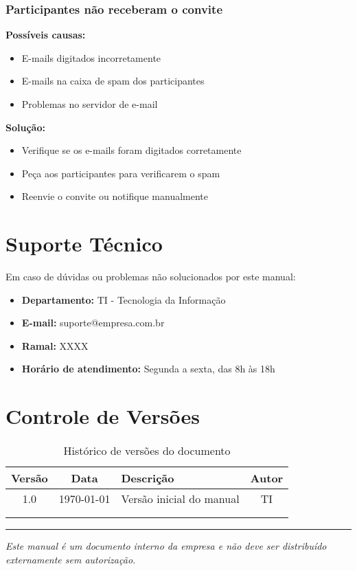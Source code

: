 \documentclass[12pt,a4paper]{article}
\begin{document}
\subsubsection{Participantes não receberam o convite}

\textbf{Possíveis causas:}
\begin{itemize}[leftmargin=*]
    \item E-mails digitados incorretamente
    \item E-mails na caixa de spam dos participantes
    \item Problemas no servidor de e-mail
\end{itemize}

\textbf{Solução:}
\begin{itemize}[leftmargin=*]
    \item Verifique se os e-mails foram digitados corretamente
    \item Peça aos participantes para verificarem o spam
    \item Reenvie o convite ou notifique manualmente
\end{itemize}

\newpage

\section{Suporte Técnico}

Em caso de dúvidas ou problemas não solucionados por este manual:

\vspace{0.5cm}

\begin{itemize}[leftmargin=*]
    \item \textbf{Departamento:} TI - Tecnologia da Informação
    \item \textbf{E-mail:} suporte@empresa.com.br
    \item \textbf{Ramal:} XXXX
    \item \textbf{Horário de atendimento:} Segunda a sexta, das 8h às 18h
\end{itemize}

\vspace{1cm}

\section{Controle de Versões}

\begin{table}[H]
\centering
\begin{tabular}{|c|c|p{6cm}|c|}
\hline
\textbf{Versão} & \textbf{Data} & \textbf{Descrição} & \textbf{Autor} \\
\hline
1.0 & \today & Versão inicial do manual & TI \\
\hline
& & & \\
\hline
& & & \\
\hline
\end{tabular}
\caption{Histórico de versões do documento}
\end{table}

\vspace{2cm}

\begin{center}
\hrule
\vspace{0.3cm}
\textit{Este manual é um documento interno da empresa e não deve ser distribuído externamente sem autorização.}
\end{center}
\end{document}

